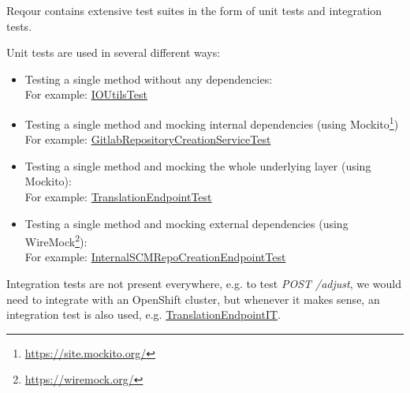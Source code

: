\documentclass[../main.tex]{subfiles}
\begin{document}
Reqour contains extensive test suites in the form of unit tests and integration tests.

Unit tests are used in several different ways:
\begin{itemize}
    \item Testing a single method without any dependencies:\\
    For example: \href{https://github.com/project-ncl/reqour/blob/akridl-thesis/core/src/test/java/org/jboss/pnc/reqour/common/utils/IOUtilsTest.java}{IOUtilsTest}

    \item Testing a single method and mocking internal dependencies (using Mockito\footnote{\url{https://site.mockito.org/}})\\
    For example: \href{https://github.com/project-ncl/reqour/blob/akridl-thesis/core/src/test/java/org/jboss/pnc/reqour/service/GitlabRepositoryCreationServiceTest.java}{GitlabRepositoryCreationServiceTest}

    \item Testing a single method and mocking the whole underlying layer (using Mockito):\\
    For example: \href{https://github.com/project-ncl/reqour/blob/akridl-thesis/rest/src/test/java/org/jboss/pnc/reqour/rest/endpoints/TranslationEndpointTest.java}{TranslationEndpointTest}

    \item Testing a single method and mocking external dependencies (using WireMock\footnote{\url{https://wiremock.org/}}):\\
    For example: \href{https://github.com/project-ncl/reqour/blob/akridl-thesis/rest/src/test/java/org/jboss/pnc/reqour/rest/endpoints/InternalSCMRepoCreationEndpointTest.java}{InternalSCMRepoCreationEndpointTest}
\end{itemize}

Integration tests are not present everywhere, e.g. to test \textit{POST /adjust}, we would need to integrate with an OpenShift cluster, but whenever it makes sense, an integration test is also used, e.g. \href{https://github.com/project-ncl/reqour/blob/akridl-thesis/rest/src/test/java/org/jboss/pnc/reqour/rest/endpoints/TranslationEndpointIT.java}{TranslationEndpointIT}.
\end{document}
